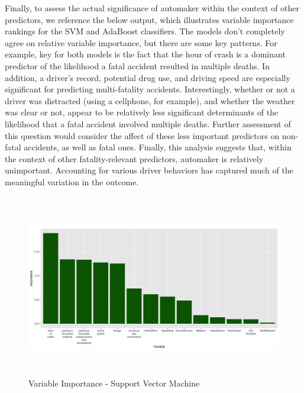 \documentclass[11pt, oneside,titlepage]{article}   	%
\begin{document}
Finally, to assess the actual significance of automaker within the context of other predictors, we reference the below output, which illustrates variable importance rankings for the SVM and AdaBoost classifiers. The models don't completely agree on relative variable importance, but there are some key patterns. For example, key for both models is the fact that the hour of crash is a dominant predictor of the likelihood a fatal accident resulted in multiple deaths. In addition, a driver's record, potential drug use, and driving speed are especially significant for predicting multi-fatality accidents. Interestingly, whether or not a driver was distracted (using a cellphone, for example), and whether the weather was clear or not, appear to be relatively less significant determinants of the likelihood that a fatal accident involved multiple deaths. Further assessment of this question would consider the affect of these less important predictors on non-fatal accidents, as well as fatal ones. Finally, this analysis suggests that, within the context of other fatality-relevant predictors, automaker is relatively unimportant. Accounting for various driver behaviors has captured much of the meaningful variation in the outcome. \\

\begin{figure}[H]
\centering
  \includegraphics[width=15cm,height=8cm,keepaspectratio]{ImportancePlot_SVM.png}
\caption{Variable Importance - Support Vector Machine}
\end{figure}
\end{document}
